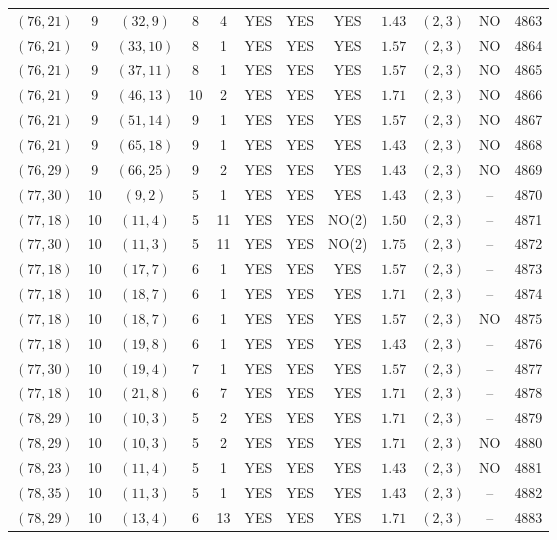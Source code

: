 \begin{longtable}{|c|c|c|c|c|c|c|c|c|c|c|c|}
$(76,21)$ & 9 & $(32,9)$ & 8 & 4 & YES & YES & YES & $1.43$ & $(2,3)$ & NO & 4863\\
$(76,21)$ & 9 & $(33,10)$ & 8 & 1 & YES & YES & YES & $1.57$ & $(2,3)$ & NO & 4864\\
$(76,21)$ & 9 & $(37,11)$ & 8 & 1 & YES & YES & YES & $1.57$ & $(2,3)$ & NO & 4865\\
$(76,21)$ & 9 & $(46,13)$ & 10 & 2 & YES & YES & YES & $1.71$ & $(2,3)$ & NO & 4866\\
$(76,21)$ & 9 & $(51,14)$ & 9 & 1 & YES & YES & YES & $1.57$ & $(2,3)$ & NO & 4867\\
$(76,21)$ & 9 & $(65,18)$ & 9 & 1 & YES & YES & YES & $1.43$ & $(2,3)$ & NO & 4868\\
$(76,29)$ & 9 & $(66,25)$ & 9 & 2 & YES & YES & YES & $1.43$ & $(2,3)$ & NO & 4869\\
$(77,30)$ & 10 & $(9,2)$ & 5 & 1 & YES & YES & YES & $1.43$ & $(2,3)$ & -- & 4870\\
$(77,18)$ & 10 & $(11,4)$ & 5 & 11 & YES & YES & NO(2) & $1.50$ & $(2,3)$ & -- & 4871\\
$(77,30)$ & 10 & $(11,3)$ & 5 & 11 & YES & YES & NO(2) & $1.75$ & $(2,3)$ & -- & 4872\\
$(77,18)$ & 10 & $(17,7)$ & 6 & 1 & YES & YES & YES & $1.57$ & $(2,3)$ & -- & 4873\\
$(77,18)$ & 10 & $(18,7)$ & 6 & 1 & YES & YES & YES & $1.71$ & $(2,3)$ & -- & 4874\\
$(77,18)$ & 10 & $(18,7)$ & 6 & 1 & YES & YES & YES & $1.57$ & $(2,3)$ & NO & 4875\\
$(77,18)$ & 10 & $(19,8)$ & 6 & 1 & YES & YES & YES & $1.43$ & $(2,3)$ & -- & 4876\\
$(77,30)$ & 10 & $(19,4)$ & 7 & 1 & YES & YES & YES & $1.57$ & $(2,3)$ & -- & 4877\\
$(77,18)$ & 10 & $(21,8)$ & 6 & 7 & YES & YES & YES & $1.71$ & $(2,3)$ & -- & 4878\\
$(78,29)$ & 10 & $(10,3)$ & 5 & 2 & YES & YES & YES & $1.71$ & $(2,3)$ & -- & 4879\\
$(78,29)$ & 10 & $(10,3)$ & 5 & 2 & YES & YES & YES & $1.71$ & $(2,3)$ & NO & 4880\\
$(78,23)$ & 10 & $(11,4)$ & 5 & 1 & YES & YES & YES & $1.43$ & $(2,3)$ & NO & 4881\\
$(78,35)$ & 10 & $(11,3)$ & 5 & 1 & YES & YES & YES & $1.43$ & $(2,3)$ & -- & 4882\\
$(78,29)$ & 10 & $(13,4)$ & 6 & 13 & YES & YES & YES & $1.71$ & $(2,3)$ & -- & 4883\\

\end{longtable}
